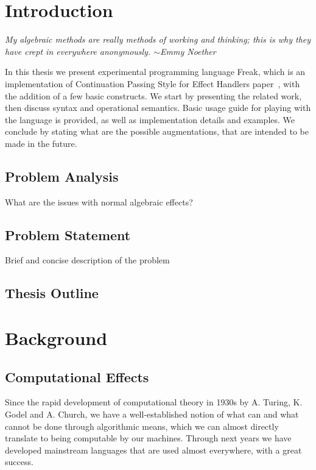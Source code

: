 \documentclass[declaration,shortabstract]{iithesis}
\author{Mateusz Urbańczyk}
\date{1 września 2020}                     %
\theoremstyle{definition} \newtheorem{definition}{Definition}[chapter]
\theoremstyle{remark} \newtheorem{remark}[definition]{Observation}
\theoremstyle{plain} \newtheorem{theorem}[definition]{Theorem}
\theoremstyle{plain} \newtheorem{lemma}[definition]{Lemma}
\begin{document}
\chapter{Introduction}

\textit{
    My algebraic methods are really methods of working and thinking; this is why
    they have crept in everywhere anonymously. $\sim{}$Emmy Noether
}


In this thesis we present experimental programming language Freak, which is an
implementation of Continuation Passing Style for Effect Handlers paper~\cite{handlers-cps},
with the addition of a few basic constructs. We start by presenting the related work,
then discuss syntax and operational semantics. Basic usage guide for playing with the
language is provided, as well as implementation details and examples. We conclude by
stating what are the possible augmentations, that are intended to be made in the future.

\section{Problem Analysis}

What are the issues with normal algebraic effects?

\section{Problem Statement}

Brief and concise description of the problem

\section{Thesis Outline}

\chapter{Background}

\section{Computational Effects}

Since the rapid development of computational theory in 1930s by A. Turing, K. Godel and
A. Church, we have a well-established notion of what can and what cannot be done
through algorithmic means, which we can almost directly translate to being computable
by our machines. Through next years we have developed mainstream languages that are used
almost everywhere, with a great success.
\end{document}
